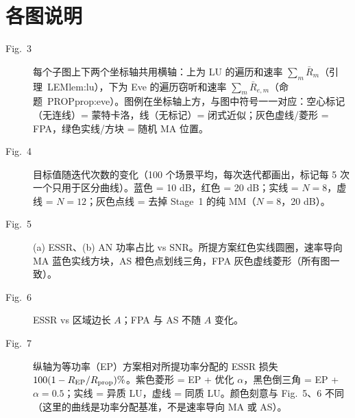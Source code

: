 \documentclass[11pt,a4paper]{ctexart}
\begin{document}
\section{各图说明}
\begin{description}
\item[Fig.~3] 每个子图上下两个坐标轴共用横轴：上为 LU 的遍历和速率 $\sum_m\bar R_m$（引理~LEM{lem:lu}），下为 Eve 的遍历窃听和速率 $\sum_m\bar R_{e,m}$（命题~PROP{prop:eve}）。图例在坐标轴上方，与图中符号一一对应：空心标记（无连线）= 蒙特卡洛，线（无标记）= 闭式近似；灰色虚线/菱形 = FPA，绿色实线/方块 = 随机 MA 位置。
\item[Fig.~4] 目标值随迭代次数的变化（100 个场景平均，每次迭代都画出，标记每 5 次一个只用于区分曲线）。蓝色 = 10 dB，红色 = 20 dB；实线 = $N=8$，虚线 = $N=12$；灰色点线 = 去掉 Stage~1 的纯 MM（$N=8$，20 dB）。
\item[Fig.~5] (a) ESSR、(b) AN 功率占比 vs SNR。所提方案红色实线圆圈，速率导向 MA 蓝色实线方块，AS 橙色点划线三角，FPA 灰色虚线菱形（所有图一致）。
\item[Fig.~6] ESSR vs 区域边长 $A$；FPA 与 AS 不随 $A$ 变化。
\item[Fig.~7] 纵轴为等功率（EP）方案相对所提功率分配的 ESSR 损失 $100(1-R_{\rm EP}/R_{\rm prop})\%$。紫色菱形 = EP + 优化 $\alpha$，黑色倒三角 = EP + $\alpha=0.5$；实线 = 异质 LU，虚线 = 同质 LU。颜色刻意与 Fig.~5、6 不同（这里的曲线是功率分配基准，不是速率导向 MA 或 AS）。
\end{description}

\end{document}
